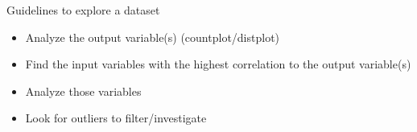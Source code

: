 \begin{frame}{Guidelines to explore a dataset}
  \begin{itemize}[<+->]
  \item Analyze the output variable(s) (countplot/distplot)
  \item Find the input variables with the highest correlation to the output variable(s)
  \item Analyze those variables
  \item Look for outliers to filter/investigate
  \end{itemize}
\end{frame}
